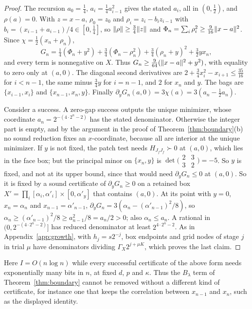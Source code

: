 \begin{proof}
The recursion $a_0=\frac14$, $a_i=\frac14a_{i-1}^2$ gives the stated $a_i$,
all in $(0,\frac12)$, and $\rho(a)=0$. With $z=x-a$, $\rho_0=z_0$ and
$\rho_i=z_i-b_iz_{i-1}$ with $b_i=(x_{i-1}+a_{i-1})/4\in[0,\frac14]$, so
$\lVert \rho\rVert\ge\frac34\lVert z\rVert$ and $\Phi_n=\sum_i\rho_i^2\ge\frac9{16}\lVert x-a\rVert^2$.
Since $\chi=\frac12(x_n+\rho_n)$,
\[
G_n=\tfrac14(\Phi_n+y^2)+\tfrac34(\Phi_n-\rho_n^2)+\tfrac34(\rho_n+y)^2+\tfrac32yx_n ,
\]
and every term is nonnegative on $X$. Thus
$G_n\ge\frac9{64}(\lVert x-a\rVert^2+y^2)$, with equality to zero only at $(a,0)$.
The diagonal second derivatives are $2+\frac34x_i^2-x_{i+1}\le\frac{35}{16}$
for $i<n-1$, the same minus $\frac34y$ for $i=n-1$, and $2$ for $x_n$ and
$y$. The bags are $\{x_{i-1},x_i\}$ and $\{x_{n-1},x_n,y\}$. Finally
$\partial_yG_n(a,0)=3\chi(a)=3(a_n-\frac12a_n)$.

Consider a success. A zero-gap success outputs the unique minimizer, whose
coordinate $a_n=2^{-(4\cdot2^n-2)}$ has the stated denominator. Otherwise
the integer part is empty, and by the argument in the proof of
Theorem~\ref{thm:boundary}(b) no sound reduction fixes an $x$-coordinate,
because all are interior at the unique minimizer. If $y$ is not fixed, the
patch test needs $H_{J_fJ_f}\succ0$ at $(a,0)$, which lies in the face box; but
the principal minor on $\{x_n,y\}$ is
$\det\bigl(\begin{smallmatrix}2&3\\3&2\end{smallmatrix}\bigr)=-5$. So $y$ is
fixed, and not at its upper bound, since that would need
$\partial_yG_n\le0$ at $(a,0)$. So it is fixed by a sound certificate of
$\partial_yG_n\ge0$ on a retained box
$X'=\prod_i[\alpha_i,\alpha'_i]\times[0,\alpha'_y]$ that contains $(a,0)$. At
its point with $y=0$, $x_n=\alpha_n$ and $x_{n-1}=\alpha'_{n-1}$,
$\partial_yG_n=3(\alpha_n-(\alpha'_{n-1})^2/8)$, so
$\alpha_n\ge(\alpha'_{n-1})^2/8\ge a_{n-1}^2/8=a_n/2>0$; also $\alpha_n\le a_n$.
A rational in $(0,2^{-(4\cdot2^n-2)}]$ has reduced denominator at least
$2^{4\cdot2^n-2}$. As in Appendix~\ref{app:growth}, with $h_j=s2^{-j}$, box
endpoints and grid nodes of stage $j$ in trial $\mu$ have denominators
dividing $\Gamma_X2^{j+\mu K}$, which proves the last claim.
\end{proof}

Here $I=O(n\log n)$ while every successful certificate of the above form
needs exponentially many bits in $n$, at fixed $d$, $p$ and $\kappa$. Thus
the $B_\lambda$ term of Theorem~\ref{thm:boundary} cannot be removed without
a different kind of certificate, for instance one that keeps the correlation
between $x_{n-1}$ and $x_n$, such as the displayed identity.

